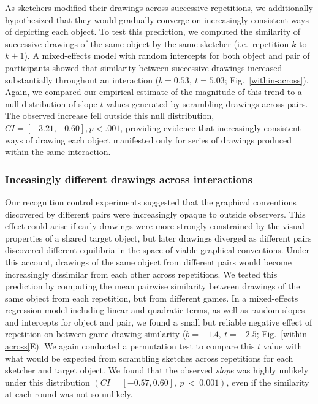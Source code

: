 \documentclass[10pt,letterpaper]{article}
\begin{document}
As sketchers modified their drawings across successive repetitions, we additionally hypothesized that they would gradually converge on increasingly consistent ways of depicting each object.
To test this prediction, we computed the similarity of successive drawings of the same object by the same sketcher (i.e.~repetition $k$ to $k+1$). %
A mixed-effects model with random intercepts for both object and pair of participants showed that similarity between successive drawings increased substantially throughout an interaction ($b = 0.53,~t = 5.03$; Fig.~\ref{within-across}).
Again, we compared our empirical estimate of the magnitude of this trend to a null distribution of slope $t$ values generated by scrambling drawings across pairs.%
The observed increase fell outside this null distribution, $CI = [-3.21, -0.60], p < .001$, providing evidence that increasingly consistent ways of drawing each object manifested only for series of drawings produced within the same interaction.

\subsubsection{Inceasingly different drawings across interactions}

Our recognition control experiments suggested that the graphical conventions discovered by different pairs were increasingly opaque to outside observers.
This effect could arise if early drawings were more strongly constrained by the visual properties of a shared target object, but later drawings diverged as different pairs discovered different equilibria in the space of viable graphical conventions.
Under this account, drawings of the same object from different pairs would become increasingly dissimilar from each other across repetitions.
We tested this prediction by computing the mean pairwise similarity between drawings of the same object from each repetition, but from different games.
In a mixed-effects regression model including linear and quadratic terms, as well as random slopes and intercepts for object and pair, we found a small but reliable negative effect of repetition on between-game drawing similarity ($b = -1.4, ~t = -2.5$; Fig.~\ref{within-across}E). %
We again conducted a permutation test to compare this $t$ value with what would be expected from scrambling sketches across repetitions for each sketcher and target object.
We found that the observed \emph{slope} was highly unlikely under this distribution $(CI = [-0.57, 0.60],~p~<~0.001)$, even if the similarity at each round was not so unlikely.
\end{document}
